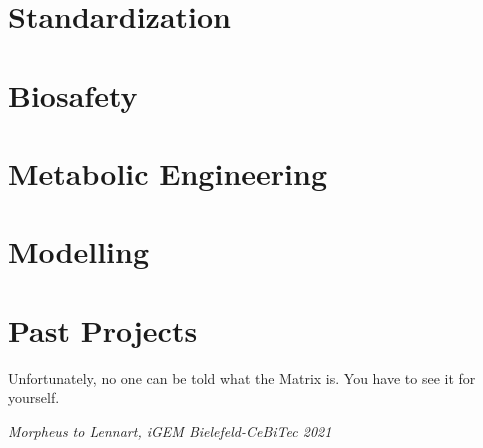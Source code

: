 \documentclass{tstextbook}
\begin{document}
\chapter{Standardization}




\chapter{Biosafety}




\chapter{Metabolic Engineering}




\chapter{Modelling}




\chapter{Past Projects}

\epigraph{Unfortunately, no one can be told what the Matrix is. You have to see it for yourself.}{\textit{Morpheus to Lennart, iGEM Bielefeld-CeBiTec 2021}}
\end{document}
